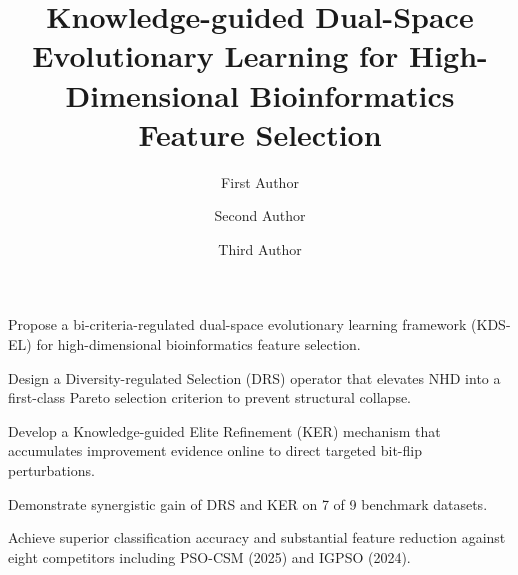 \documentclass[a4paper,fleqn]{cas-dc}
\begin{document}
\begin{sloppypar}
	\let\WriteBookmarks\relax
	\def\floatpagepagefraction{1}
	\def\textpagefraction{.001}
	\let\printorcid\relax

	\title [mode = title]{Knowledge-guided Dual-Space Evolutionary Learning
	for High-Dimensional Bioinformatics Feature Selection}

	\author[1]{\textcolor[RGB]{0,0,1}{First Author}}
	\fnmark[1]

	\author[1]{\textcolor[RGB]{0,0,1}{Second Author}}
	\fnmark[1]
	\cormark[1]

	\author[1]{\textcolor[RGB]{0,0,1}{Third Author}}
	\fnmark[1]

	\address[1]{School of Computer Science and Technology, University Name, City, Country}


	\begin{highlights}
	\item Propose a bi-criteria-regulated dual-space evolutionary learning
	      framework (KDS-EL) for high-dimensional bioinformatics feature selection.
	\item Design a Diversity-regulated Selection (DRS) operator that elevates
	      NHD into a first-class Pareto selection criterion to prevent structural collapse.
	\item Develop a Knowledge-guided Elite Refinement (KER) mechanism that
	      accumulates improvement evidence online to direct targeted bit-flip perturbations.
	\item Demonstrate synergistic gain of DRS and KER on 7 of 9 benchmark datasets.
	\item Achieve superior classification accuracy and substantial feature reduction
	      against eight competitors including PSO-CSM (2025) and IGPSO (2024).
	\end{highlights}


\end{sloppypar}
\end{document}
